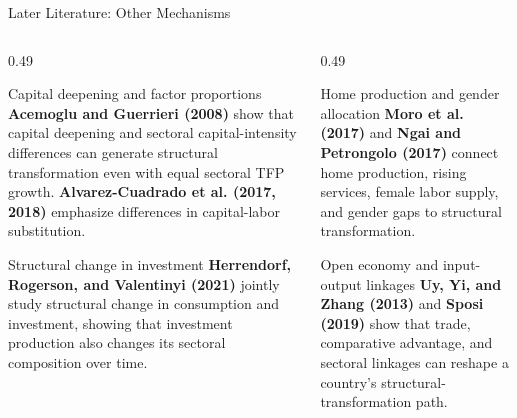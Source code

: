\begin{frame}{Later Literature: Other Mechanisms}
  \scriptsize
  \begin{columns}[T,onlytextwidth]
    \begin{column}{0.49\textwidth}
      \begin{block}{Capital deepening and factor proportions}
        \textbf{Acemoglu and Guerrieri (2008)} show that capital deepening and
        sectoral capital-intensity differences can generate structural
        transformation even with equal sectoral TFP growth.
        \textbf{Alvarez-Cuadrado et al. (2017, 2018)} emphasize differences in
        capital-labor substitution.
      \end{block}

      \vspace{0.07cm}
      \begin{block}{Structural change in investment}
        \textbf{Herrendorf, Rogerson, and Valentinyi (2021)} jointly study
        structural change in consumption and investment, showing that investment
        production also changes its sectoral composition over time.
      \end{block}
    \end{column}
    \begin{column}{0.49\textwidth}
      \begin{block}{Home production and gender allocation}
        \textbf{Moro et al. (2017)} and \textbf{Ngai and Petrongolo (2017)}
        connect home production, rising services, female labor supply, and gender
        gaps to structural transformation.
      \end{block}

      \vspace{0.07cm}
      \begin{block}{Open economy and input-output linkages}
        \textbf{Uy, Yi, and Zhang (2013)} and \textbf{Sposi (2019)} show that
        trade, comparative advantage, and sectoral linkages can reshape a
        country's structural-transformation path.
      \end{block}
    \end{column}
  \end{columns}
\end{frame}

